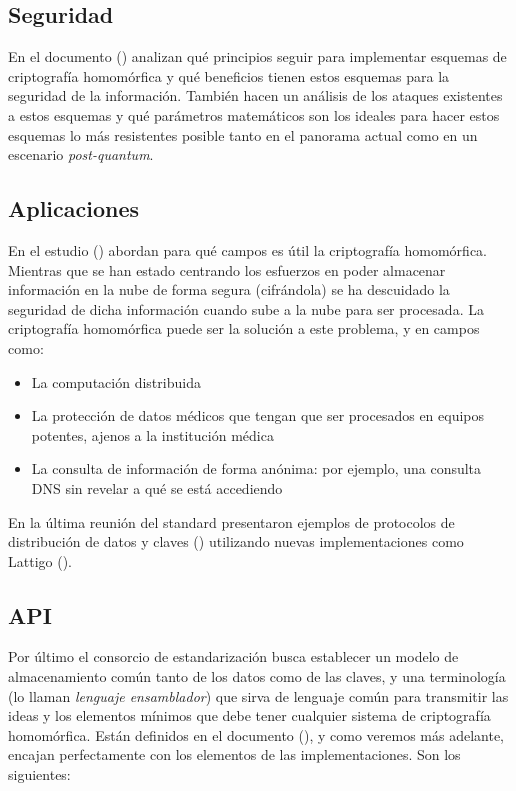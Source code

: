 \subsection{Seguridad}

En el documento (\cite{chase_security_2017}) analizan qué principios seguir para implementar esquemas de criptografía homomórfica y qué beneficios tienen estos esquemas para la seguridad de la información. También hacen un análisis de los ataques existentes a estos esquemas y qué parámetros matemáticos son los ideales para hacer estos esquemas lo más resistentes posible tanto en el panorama actual como en un escenario \textit{post-quantum}.

\subsection{Aplicaciones}

En el estudio (\cite{archer_applications_2017}) abordan para qué campos es útil la criptografía homomórfica. Mientras que se han estado centrando los esfuerzos en poder almacenar información en la nube de forma segura (cifrándola) se ha descuidado la seguridad de dicha información cuando sube a la nube para ser procesada. La criptografía homomórfica puede ser la solución a este problema, y en campos como:

\begin{itemize}
    \item La computación distribuida
    \item La protección de datos médicos que tengan que ser procesados en equipos potentes, ajenos a la institución médica
    \item La consulta de información de forma anónima: por ejemplo, una consulta DNS sin revelar a qué se está accediendo
\end{itemize}

En la última reunión del standard presentaron ejemplos de protocolos de distribución de datos y claves (\cite{troncoso-pastoriza_homomorphic_nodate}) utilizando nuevas implementaciones como Lattigo (\cite{noauthor_lattigo_2019}).

\subsection{API}

Por último el consorcio de estandarización busca establecer un modelo de almacenamiento común tanto de los datos como de las claves, y una terminología (lo llaman \textit{lenguaje ensamblador}) que sirva de lenguaje común para transmitir las ideas y los elementos mínimos que debe tener cualquier sistema de criptografía homomórfica. Están definidos en el documento (\cite{brenner_standard_2017}), y como veremos más adelante, encajan perfectamente con los elementos de las implementaciones. Son los siguientes:

